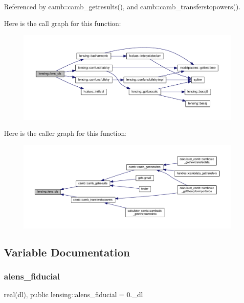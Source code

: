 Referenced by camb\+::camb\+\_\+getresults(), and camb\+::camb\+\_\+transferstopowers().

Here is the call graph for this function\+:
\nopagebreak
\begin{figure}[H]
\begin{center}
\leavevmode
\includegraphics[width=350pt]{namespacelensing_a71d315283bcce7fb9626733365bf43e6_cgraph}
\end{center}
\end{figure}
Here is the caller graph for this function\+:
\nopagebreak
\begin{figure}[H]
\begin{center}
\leavevmode
\includegraphics[width=350pt]{namespacelensing_a71d315283bcce7fb9626733365bf43e6_icgraph}
\end{center}
\end{figure}


\subsection{Variable Documentation}
\mbox{\label{namespacelensing_a3a5d51bfc096d14582dbf48fc094ffee}} 
\subsubsection{\texorpdfstring{alens\+\_\+fiducial}{alens\_fiducial}}
{\footnotesize\ttfamily real(dl), public lensing\+::alens\+\_\+fiducial = 0.\+\_\+dl}



